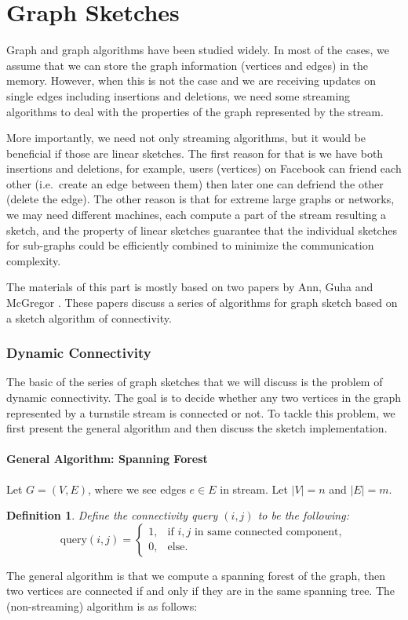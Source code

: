\documentclass[11pt]{article}
\theoremstyle{plain}
\newtheorem{definition}[theorem]{Definition}
\begin{document}
\pagebreak
\part{Graph Sketches}
\label{p:graph}

Graph and graph algorithms have been studied widely. In most of the cases, we 
assume that we can store the graph information (vertices and edges) in the 
memory. However, when this is not the case and we are receiving updates on 
single edges including insertions and deletions, we need some streaming 
algorithms to deal with the properties of the graph represented by the stream. 

More importantly, we need not only streaming algorithms, but it would be 
beneficial if those are linear sketches. The first reason for that is we have both 
insertions and deletions, for example, users (vertices) on Facebook can friend 
each other (i.e.\ create an edge between them) then later one can defriend the 
other (delete the edge). The other reason is that for extreme large graphs or 
networks, we may need different machines, each compute a part of the stream 
resulting a sketch, and the property of linear sketches guarantee that the 
individual sketches for sub-graphs could be efficiently combined to minimize 
the communication complexity. 

The materials of this part is mostly based on two papers by Ann, Guha and 
McGregor  \cite{AGM2012-analyzing, AGM2012-graph}. These 
papers discuss a series of algorithms for graph sketch based on a sketch 
algorithm of connectivity. 

\section{Dynamic Connectivity}
\label{s:dc}
The basic of the series of graph sketches that we will discuss is the problem of 
dynamic connectivity. The goal is to decide whether any two vertices in the 
graph represented by a 
turnstile stream is connected or not. To tackle this problem, we first present the 
general algorithm and then discuss the sketch implementation. 


\subsection{General Algorithm: Spanning Forest}
Let $G=(V,E)$, where we see edges $e\in E$ in stream. Let $|V|=n$ and $|E|=m$.
\begin{definition}
Define the connectivity query $(i,j)$ to be the following: 
\[
\text{query}(i,j)=
\begin{cases}
1, & \text{if $i,j$ in same connected component}, \\
0, & \text{else}.
\end{cases}
\]
\end{definition}
The general algorithm is that we compute a spanning forest of the graph, then 
two vertices are connected if and only if they are in the same spanning tree. The 
(non-streaming) algorithm is as follows:
\end{document}
